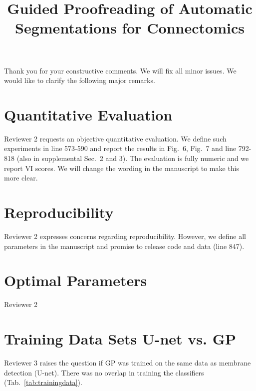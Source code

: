 \documentclass[10pt,twocolumn,letterpaper]{article}
\begin{document}
\title{Guided Proofreading of Automatic Segmentations for Connectomics}  %

\maketitle
\thispagestyle{empty}

Thank you for your constructive comments. We will fix all minor issues. We would like to clarify the following major remarks.

\section{Quantitative Evaluation}
Reviewer 2 requests an objective quantitative evaluation. We define such experiments in line 573-590 and report the results in Fig.~6, Fig.~7 and line 792-818 (also in supplemental Sec.~2 and 3). The evaluation is fully numeric and we report VI scores. We will change the wording in the manuscript to make this more clear.

\section{Reproducibility}
Reviewer 2 expresses concerns regarding reproducibility. However, we define all parameters in the manuscript and promise to release code and data (line 847).

\section{Optimal Parameters}
Reviewer 2 


\section{Training Data Sets U-net vs. GP}
Reviewer 3 raises the question if GP was trained on the same data as membrane detection (U-net). There was no overlap in training the classifiers (Tab.~\ref{tab:trainingdata}).
\end{document}
